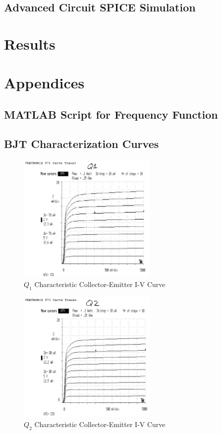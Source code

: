 \documentclass[titlepage, letterpaper, 10.5pt]{article}
\begin{document}
\subsection{Advanced Circuit SPICE Simulation}

\section{Results}

\clearpage
\section{Appendices}
\subsection{MATLAB Script for Frequency Function}
\label{matlab-plotting-script}


\clearpage
\subsection{BJT Characterization Curves}
\label{bjt-appendix}

\begin{figure}[ht]
	\centering
	\includegraphics[width=0.6\textwidth]{results/q1-characteristics}
	\caption{$Q_{1}$ Characteristic Collector-Emitter I-V Curve}
\end{figure}

\begin{figure}[ht]
	\centering
	\includegraphics[width=0.6\textwidth]{results/q2-characteristics}
	\caption{$Q_{2}$ Characteristic Collector-Emitter I-V Curve}
\end{figure}
\end{document}
